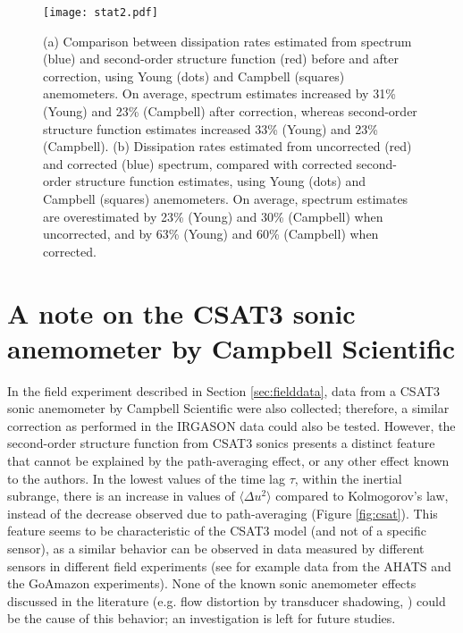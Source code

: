 \documentclass{svjour3}                     %
\begin{document}
\begin{figure}\centering
  \texttt{[image: stat2.pdf]}
  \caption{(a) Comparison between dissipation rates estimated from
    spectrum (blue) and second-order structure function (red) before
    and after correction, using Young (dots) and Campbell (squares)
    anemometers. On average, spectrum estimates increased by 31\%
    (Young) and 23\% (Campbell) after correction, whereas second-order
    structure function estimates increased 33\% (Young) and 23\%
    (Campbell). (b) Dissipation rates estimated from uncorrected (red)
    and corrected (blue) spectrum, compared with corrected
    second-order structure function estimates, using Young (dots) and
    Campbell (squares) anemometers. On average, spectrum estimates
    are overestimated by 23\% (Young) and 30\% (Campbell) when
    uncorrected, and by 63\% (Young) and 60\% (Campbell) when
    corrected.\label{fig:stat}}
\end{figure}


\section{A note on the CSAT3 sonic anemometer by Campbell Scientific}

In the field experiment described in Section \ref{sec:fielddata}, data
from a CSAT3 sonic anemometer by Campbell Scientific were also
collected; therefore, a similar correction as performed in the IRGASON
data could also be tested. However, the second-order structure
function from CSAT3 sonics presents a distinct feature that cannot be
explained by the path-averaging effect, or any other effect known to
the authors. In the lowest values of the time lag $\tau$, within the
inertial subrange, there is an increase in values of $\langle \Delta
u^2\rangle$ compared to Kolmogorov's law, instead of the decrease
observed due to path-averaging (Figure \ref{fig:csat}). This feature
seems to be characteristic of the CSAT3 model (and not of a specific
sensor), as a similar behavior can be observed in data measured by
different sensors in different field experiments (see for example data
from the AHATS \citep{SalCha2012} and the GoAmazon \citep{FueCha2016}
experiments). None of the known sonic anemometer effects discussed in
the literature (e.g. flow distortion by transducer shadowing,
\citep{HorSem2015}) could be the cause of this behavior; an
investigation is left for future studies.
\end{document}
